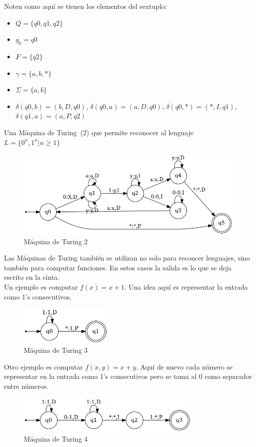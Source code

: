\documentclass[a4paper,1pt]{report}
\begin{document}
\newpage
Noten como aquí se tienen los elementos del sextuplo:
\begin{itemize}
 \item $Q=\{q0,q1,q2\}$
 \item$q_0=q0$
 \item $F=\{q2\}$
 \item $\gamma=\{a,b,*\}$
 \item $\Sigma=\{a,b\}$
 \item $\delta(q0,b)=(b,D,q0)$, $\delta(q0,a)=(a,D,q0)$, $\delta(q0,*)=(*,I,q1)$,\\ $\delta(q1,a)=(a,P,q2)$ 
\end{itemize}


Una Máquina de Turing~(2) que permite reconocer al lenguaje\\ 
 $L=\{0^n,1^n|n\geq 1\}$

 \begin{figure}[H]
        \centering
        \includegraphics[width=1.1\textwidth]{figures9/tm2.png}
        \caption{Máquina de Turing 2}
\end{figure} 


Las Máquinas de Turing también se utilizan no solo para reconcer lenguajes, sino también para computar funciones. En estos casos la salida es lo que se deja escrito en la cinta.\\

Un ejemplo es computar $f(x)=x+1$. Una idea aquí es representar la entrada como 1's consecutivos.

 \begin{figure}[H]
        \centering
        \includegraphics[width=0.4\textwidth]{figures9/tm3.png}
        \caption{Máquina de Turing 3}
\end{figure} 

\newpage

Otro ejemplo es computar $f(x,y)=x+y$. Aquí de nuevo cada número se representar en la entrada como 1's consecutivos pero se toma al 0 como separador entre números.


 \begin{figure}[H]
        \centering
        \includegraphics[width=0.8\textwidth]{figures9/tm4.png}
        \caption{Máquina de Turing 4}
\end{figure} 
  
\end{document}
